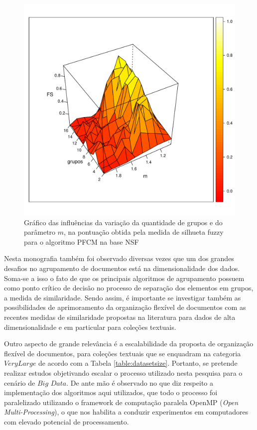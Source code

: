 \begin{figure}[!htp] \centering 
  \centering
  \includegraphics[width=0.8\columnwidth]{assets/future_works/pfcm_nsf_varying.pdf} 
  \caption{Gráfico das influências da variação da quantidade de grupos e do parâmetro $m$, na
pontuação obtida pela medida de silhueta fuzzy para o algoritmo PFCM na base NSF} 
  \label{fig:pfcmvarying}
\end{figure}

Nesta monografia também foi observado diversas vezes que um dos grandes desafios no agrupamento de
documentos está na dimensionalidade dos dados. Soma-se a isso o fato de que os principais algoritmos
de agrupamento possuem como ponto crítico de decisão no processo de separação dos elementos em
grupos, a medida de similaridade. Sendo assim, é importante se investigar também as possibilidades de
aprimoramento da organização flexível de documentos com as recentes medidas de similaridade
propostas na literatura \cite{Lin2014,Nagwani2015} para dados de alta dimensionalidade e em
particular para coleções textuais.

Outro aspecto de grande relevância é a escalabilidade da proposta de organização flexível de
documentos, para coleções textuais que se enquadram na categoria $Very Large$ de acordo com a Tabela
\ref{table:datasetsize}. Portanto, se pretende realizar estudos objetivando escalar o processo
utilizado nesta pesquisa para o cenário de $Big$ $Data$. De ante mão é observado no que diz respeito
a implementação dos algoritmos aqui utilizados, que todo o processo foi paralelizado utilizando o
framework de computação paralela OpenMP ({\it Open Multi-Processing\/})\footnotemark, o que nos
habilita a conduzir experimentos em computadores com elevado potencial de processamento.

